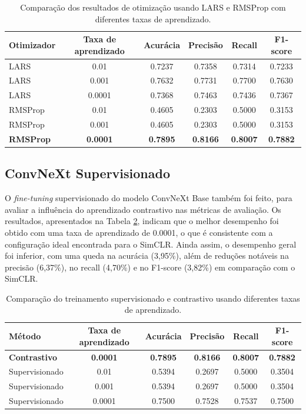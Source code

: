 \begin{table}[htbp]
  \caption{Comparação dos resultados de otimização usando LARS e RMSProp com diferentes taxas de aprendizado.}
  \label{tab:optimizer_comparison}
  \small
  \centering
  \setlength{\tabcolsep}{3pt} %
  \begin{tabular}{lccccc}
    \toprule
    Otimizador & Taxa de aprendizado & Acurácia & Precisão & Recall & F1-score \\
    \midrule
    LARS     & 0.01   & 0.7237 & 0.7358 & 0.7314 & 0.7233 \\
    LARS     & 0.001  & 0.7632 & 0.7731 & 0.7700 & 0.7630 \\
    LARS     & 0.0001 & 0.7368 & 0.7463 & 0.7436 & 0.7367 \\
    \midrule
    RMSProp  & 0.01   & 0.4605 & 0.2303 & 0.5000 & 0.3153 \\
    RMSProp  & 0.001  & 0.4605 & 0.2303 & 0.5000 & 0.3153 \\
    \textbf{RMSProp} & \textbf{0.0001} & \textbf{0.7895} & \textbf{0.8166} & \textbf{0.8007} & \textbf{0.7882} \\
    \bottomrule
  \end{tabular}
\end{table}

\subsection{ConvNeXt Supervisionado}

O \textit{fine-tuning} supervisionado do modelo ConvNeXt Base também foi feito, para avaliar a influência do aprendizado contrastivo nas métricas de avaliação. Os resultados, apresentados na Tabela \ref{tab:supervised_results}, indicam que o melhor desempenho foi obtido com uma taxa de aprendizado de 0.0001, o que é consistente com a configuração ideal encontrada para o SimCLR. Ainda assim, o desempenho geral foi inferior, com uma queda na acurácia (3,95\%), além de reduções notáveis na precisão (6,37\%), no recall (4,70\%) e no F1-score (3,82\%) em comparação com o SimCLR.

\begin{table}[htbp]
  \caption{Comparação do treinamento supervisionado e contrastivo usando diferentes taxas de aprendizado.}
  \label{tab:supervised_results}
  \centering
  \small
  \setlength{\tabcolsep}{3pt}
  \begin{tabular}{lccccc}
    \toprule
    Método & Taxa de aprendizado & Acurácia & Precisão & Recall & F1-score \\
    \midrule
    \textbf{Contrastivo} & \textbf{0.0001} & \textbf{0.7895} & \textbf{0.8166} & \textbf{0.8007} & \textbf{0.7882} \\
    \midrule
    Supervisionado & 0.01   & 0.5394 & 0.2697 & 0.5000 & 0.3504 \\
    Supervisionado & 0.001  & 0.5394 & 0.2697 & 0.5000 & 0.3504 \\
    Supervisionado & 0.0001 & 0.7500 & 0.7528 & 0.7537 & 0.7500 \\
    \bottomrule
  \end{tabular}
\end{table}


